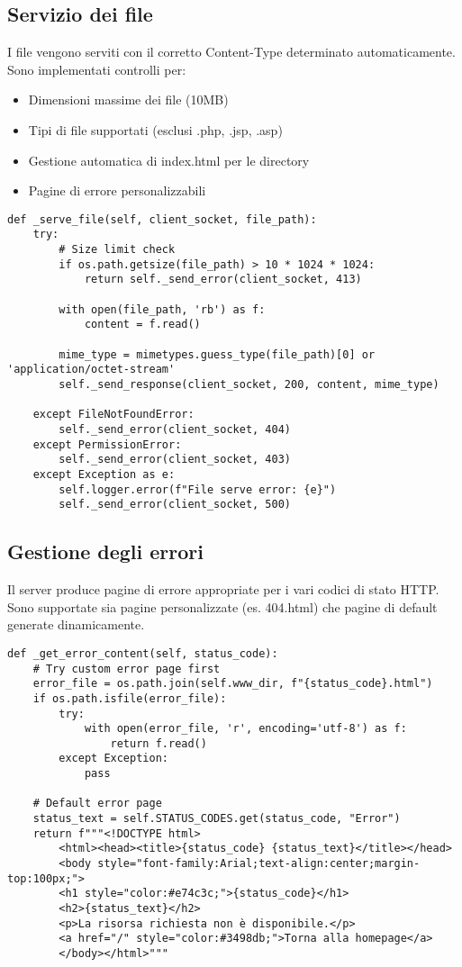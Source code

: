 \documentclass[a4paper,12pt]{report}
\begin{document}
\subsection{Servizio dei file}
I file vengono serviti con il corretto Content-Type determinato automaticamente. Sono implementati controlli per:
\begin{itemize}
    \item Dimensioni massime dei file (10MB)
    \item Tipi di file supportati (esclusi .php, .jsp, .asp)
    \item Gestione automatica di index.html per le directory
    \item Pagine di errore personalizzabili
\end{itemize}

\begin{lstlisting}
def _serve_file(self, client_socket, file_path):
    try:
        # Size limit check
        if os.path.getsize(file_path) > 10 * 1024 * 1024:
            return self._send_error(client_socket, 413)
            
        with open(file_path, 'rb') as f:
            content = f.read()
            
        mime_type = mimetypes.guess_type(file_path)[0] or 'application/octet-stream'
        self._send_response(client_socket, 200, content, mime_type)
        
    except FileNotFoundError:
        self._send_error(client_socket, 404)
    except PermissionError:
        self._send_error(client_socket, 403)
    except Exception as e:
        self.logger.error(f"File serve error: {e}")
        self._send_error(client_socket, 500)
\end{lstlisting}

\subsection{Gestione degli errori}
Il server produce pagine di errore appropriate per i vari codici di stato HTTP. Sono supportate sia pagine personalizzate (es. 404.html) che pagine di default generate dinamicamente.

\begin{lstlisting}
def _get_error_content(self, status_code):
    # Try custom error page first
    error_file = os.path.join(self.www_dir, f"{status_code}.html")
    if os.path.isfile(error_file):
        try:
            with open(error_file, 'r', encoding='utf-8') as f:
                return f.read()
        except Exception:
            pass
    
    # Default error page
    status_text = self.STATUS_CODES.get(status_code, "Error")
    return f"""<!DOCTYPE html>
        <html><head><title>{status_code} {status_text}</title></head>
        <body style="font-family:Arial;text-align:center;margin-top:100px;">
        <h1 style="color:#e74c3c;">{status_code}</h1>
        <h2>{status_text}</h2>
        <p>La risorsa richiesta non è disponibile.</p>
        <a href="/" style="color:#3498db;">Torna alla homepage</a>
        </body></html>"""
\end{lstlisting}
\end{document}
